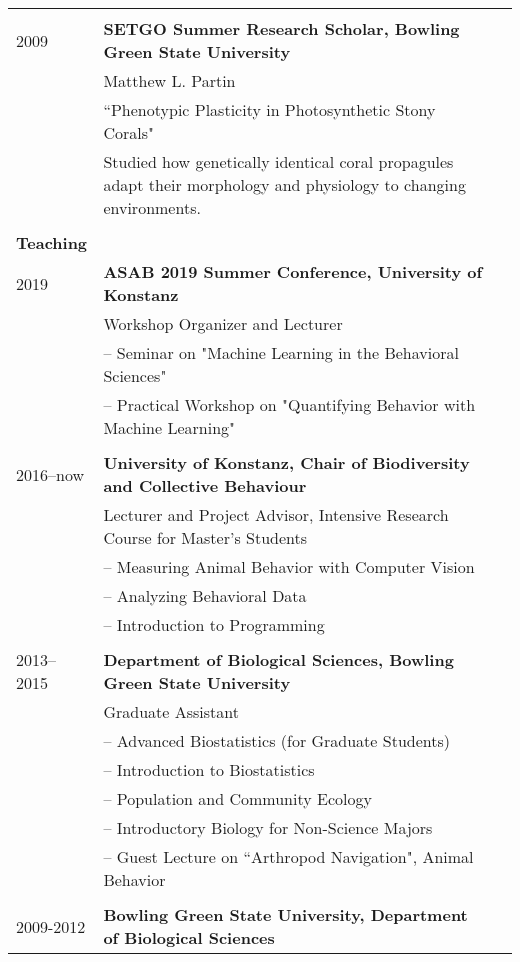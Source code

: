 \documentclass[letterpaper,7pt,oneside]{article}
\begin{document}
\begin{small}
\begin{longtable}{@{} l p{5.3in}l}
     & \\
 \large{2009}
     & \textbf{SETGO Summer Research Scholar, Bowling Green State University} \\
     & Matthew L. Partin \\
     & ``Phenotypic Plasticity in Photosynthetic Stony Corals" \vspace{1mm}\\
     & \parbox{5.0in}{Studied how genetically identical coral propagules adapt their morphology and physiology to changing environments.}\\
     & \\
\Large{\textbf{Teaching}}  \vspace{5mm} \\
 \large{2019}
	& \textbf{ASAB 2019 Summer Conference, University of Konstanz} \\
	& Workshop Organizer and Lecturer\\
	& – Seminar on "Machine Learning in the Behavioral Sciences" \\
	& – Practical Workshop on "Quantifying Behavior with Machine Learning" \\
	& \\
 \large{2016–now}
    & \textbf{University of Konstanz, Chair of Biodiversity and Collective Behaviour} \\
     & Lecturer and Project Advisor, Intensive Research Course for Master's Students \\
     & – Measuring Animal Behavior with Computer Vision \\
     & – Analyzing Behavioral Data \\
     & – Introduction to Programming \\
     & \\
 \large{2013–2015}
 & \textbf{Department of Biological Sciences, Bowling Green State University} \\
 & Graduate Assistant \\
 & – Advanced Biostatistics (for Graduate Students)\\
 & – Introduction to Biostatistics \\
 & – Population and Community Ecology \\
 & – Introductory Biology for Non-Science Majors \\
 & – Guest Lecture on ``Arthropod Navigation", Animal Behavior \\
 & \\
 \large{2009-2012}
 & \textbf{Bowling Green State University, Department of Biological Sciences} \\

\end{longtable}
\end{small}
\end{document}
